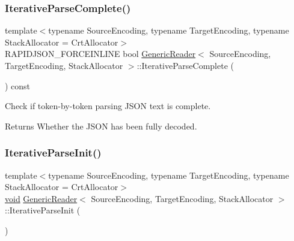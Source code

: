 \mbox{\label{classGenericReader_aa1e9e1eef614fde971550ed2f955151d}} 
\subsubsection{\texorpdfstring{Iterative\+Parse\+Complete()}{IterativeParseComplete()}}
{\footnotesize\ttfamily template$<$typename Source\+Encoding, typename Target\+Encoding, typename Stack\+Allocator = Crt\+Allocator$>$ \\
R\+A\+P\+I\+D\+J\+S\+O\+N\+\_\+\+F\+O\+R\+C\+E\+I\+N\+L\+I\+NE bool \hyperlink{classGenericReader}{Generic\+Reader}$<$ Source\+Encoding, Target\+Encoding, Stack\+Allocator $>$\+::Iterative\+Parse\+Complete (\begin{DoxyParamCaption}{ }\end{DoxyParamCaption}) const\hspace{0.3cm}{\ttfamily [inline]}}



Check if token-\/by-\/token parsing J\+S\+ON text is complete. 

\begin{DoxyReturn}{Returns}
Whether the J\+S\+ON has been fully decoded. 
\end{DoxyReturn}
\mbox{\label{classGenericReader_a7de472eda2ad9de13cfd8c1de74f1754}} 
\subsubsection{\texorpdfstring{Iterative\+Parse\+Init()}{IterativeParseInit()}}
{\footnotesize\ttfamily template$<$typename Source\+Encoding, typename Target\+Encoding, typename Stack\+Allocator = Crt\+Allocator$>$ \\
\hyperlink{imgui__impl__opengl3__loader_8h_ac668e7cffd9e2e9cfee428b9b2f34fa7}{void} \hyperlink{classGenericReader}{Generic\+Reader}$<$ Source\+Encoding, Target\+Encoding, Stack\+Allocator $>$\+::Iterative\+Parse\+Init (\begin{DoxyParamCaption}{ }\end{DoxyParamCaption})\hspace{0.3cm}{\ttfamily [inline]}}



